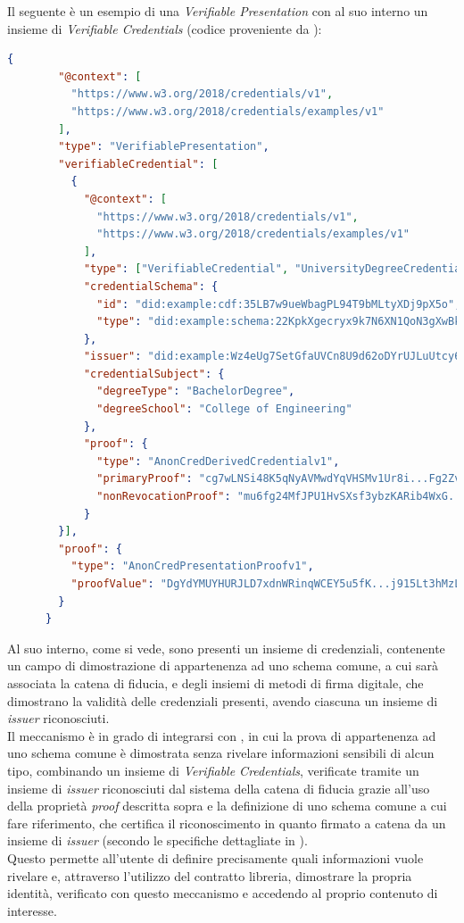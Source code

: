 Il seguente è un esempio di una \textit{Verifiable Presentation} con al suo interno un insieme di \textit{Verifiable Credentials} (codice proveniente da \cite{site:vpw3c}):
\begin{lstlisting}[language=json]
    {
        "@context": [
          "https://www.w3.org/2018/credentials/v1",
          "https://www.w3.org/2018/credentials/examples/v1"
        ],
        "type": "VerifiablePresentation",
        "verifiableCredential": [
          {
            "@context": [
              "https://www.w3.org/2018/credentials/v1",
              "https://www.w3.org/2018/credentials/examples/v1"
            ],
            "type": ["VerifiableCredential", "UniversityDegreeCredential"],
            "credentialSchema": {
              "id": "did:example:cdf:35LB7w9ueWbagPL94T9bMLtyXDj9pX5o",
              "type": "did:example:schema:22KpkXgecryx9k7N6XN1QoN3gXwBkSU8SfyyYQG"
            },
            "issuer": "did:example:Wz4eUg7SetGfaUVCn8U9d62oDYrUJLuUtcy619",
            "credentialSubject": {
              "degreeType": "BachelorDegree",
              "degreeSchool": "College of Engineering"
            },
            "proof": {
              "type": "AnonCredDerivedCredentialv1",
              "primaryProof": "cg7wLNSi48K5qNyAVMwdYqVHSMv1Ur8i...Fg2ZvWF6zGvcSAsym2sgSk737",
              "nonRevocationProof": "mu6fg24MfJPU1HvSXsf3ybzKARib4WxG...RSce53M6UwQCxYshCuS3d2h"
            }
        }],
        "proof": {
          "type": "AnonCredPresentationProofv1",
          "proofValue": "DgYdYMUYHURJLD7xdnWRinqWCEY5u5fK...j915Lt3hMzLHoPiPQ9sSVfRrs1D"
        }
      }
\end{lstlisting}

Al suo interno, come si vede, sono presenti un insieme di credenziali, contenente un campo di dimostrazione di appartenenza ad uno schema comune,
a cui sarà associata la catena di fiducia, e degli insiemi di metodi di firma digitale, che dimostrano la validità delle credenziali presenti,
avendo ciascuna un insieme di \textit{issuer} riconosciuti. \\

Il meccanismo è in grado di integrarsi con , in cui la prova di appartenenza ad uno schema comune è dimostrata
senza rivelare informazioni sensibili di alcun tipo, combinando un insieme di \textit{Verifiable Credentials}, verificate tramite 
un insieme di \textit{issuer} riconosciuti dal sistema della catena di fiducia grazie all'uso della proprietà \textit{proof} descritta sopra
e la definizione di uno schema comune a cui fare riferimento, che certifica il riconoscimento in quanto firmato a catena da un insieme di \textit{issuer}
(secondo le specifiche dettagliate in \cite{site:zkpw3c}). \\
Questo permette all'utente di definire precisamente quali informazioni vuole rivelare e, attraverso l'utilizzo del contratto libreria, 
dimostrare la propria identità, verificato con questo meccanismo e accedendo al proprio contenuto di interesse. 

